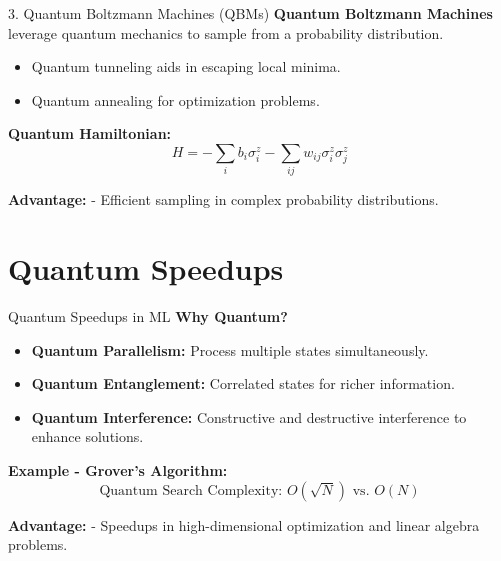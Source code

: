 \documentclass{beamer}
\begin{document}
\begin{frame}{3. Quantum Boltzmann Machines (QBMs)}
\textbf{Quantum Boltzmann Machines} leverage quantum mechanics to sample from a probability distribution.

\begin{itemize}
    \item Quantum tunneling aids in escaping local minima.
    \item Quantum annealing for optimization problems.
\end{itemize}

\pause
\textbf{Quantum Hamiltonian:}
\[
H = -\sum_i b_i \sigma_i^z - \sum_{ij} w_{ij} \sigma_i^z \sigma_j^z
\]

\textbf{Advantage:}
- Efficient sampling in complex probability distributions.
\end{frame}

\section{Quantum Speedups}
\begin{frame}{Quantum Speedups in ML}
\textbf{Why Quantum?}
\begin{itemize}
    \item \textbf{Quantum Parallelism:} Process multiple states simultaneously.
    \item \textbf{Quantum Entanglement:} Correlated states for richer information.
    \item \textbf{Quantum Interference:} Constructive and destructive interference to enhance solutions.
\end{itemize}

\pause
\textbf{Example - Grover's Algorithm:}
\[
\text{Quantum Search Complexity: } O(\sqrt{N}) \text{ vs. } O(N)
\]

\textbf{Advantage:}
- Speedups in high-dimensional optimization and linear algebra problems.
\end{frame}

\end{document}
